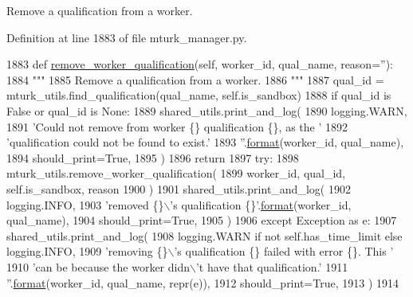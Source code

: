 \begin{DoxyVerb}Remove a qualification from a worker.
\end{DoxyVerb}
 

Definition at line 1883 of file mturk\+\_\+manager.\+py.


\begin{DoxyCode}
1883     \textcolor{keyword}{def }\hyperlink{namespaceparlai_1_1mturk_1_1core_1_1dev_1_1mturk__utils_abc2c057b91641179f7c4bb50dd916488}{remove\_worker\_qualification}(self, worker\_id, qual\_name, reason=''):
1884         \textcolor{stringliteral}{"""}
1885 \textcolor{stringliteral}{        Remove a qualification from a worker.}
1886 \textcolor{stringliteral}{        """}
1887         qual\_id = mturk\_utils.find\_qualification(qual\_name, self.is\_sandbox)
1888         \textcolor{keywordflow}{if} qual\_id \textcolor{keywordflow}{is} \textcolor{keyword}{False} \textcolor{keywordflow}{or} qual\_id \textcolor{keywordflow}{is} \textcolor{keywordtype}{None}:
1889             shared\_utils.print\_and\_log(
1890                 logging.WARN,
1891                 \textcolor{stringliteral}{'Could not remove from worker \{\} qualification \{\}, as the '}
1892                 \textcolor{stringliteral}{'qualification could not be found to exist.'}
1893                 \textcolor{stringliteral}{''}.\hyperlink{namespaceparlai_1_1chat__service_1_1services_1_1messenger_1_1shared__utils_a32e2e2022b824fbaf80c747160b52a76}{format}(worker\_id, qual\_name),
1894                 should\_print=\textcolor{keyword}{True},
1895             )
1896             \textcolor{keywordflow}{return}
1897         \textcolor{keywordflow}{try}:
1898             mturk\_utils.remove\_worker\_qualification(
1899                 worker\_id, qual\_id, self.is\_sandbox, reason
1900             )
1901             shared\_utils.print\_and\_log(
1902                 logging.INFO,
1903                 \textcolor{stringliteral}{'removed \{\}\(\backslash\)'s qualification \{\}'}.\hyperlink{namespaceparlai_1_1chat__service_1_1services_1_1messenger_1_1shared__utils_a32e2e2022b824fbaf80c747160b52a76}{format}(worker\_id, qual\_name),
1904                 should\_print=\textcolor{keyword}{True},
1905             )
1906         \textcolor{keywordflow}{except} Exception \textcolor{keyword}{as} e:
1907             shared\_utils.print\_and\_log(
1908                 logging.WARN \textcolor{keywordflow}{if} \textcolor{keywordflow}{not} self.has\_time\_limit \textcolor{keywordflow}{else} logging.INFO,
1909                 \textcolor{stringliteral}{'removing \{\}\(\backslash\)'s qualification \{\} failed with error \{\}. This '}
1910                 \textcolor{stringliteral}{'can be because the worker didn\(\backslash\)'t have that qualification.'}
1911                 \textcolor{stringliteral}{''}.\hyperlink{namespaceparlai_1_1chat__service_1_1services_1_1messenger_1_1shared__utils_a32e2e2022b824fbaf80c747160b52a76}{format}(worker\_id, qual\_name, repr(e)),
1912                 should\_print=\textcolor{keyword}{True},
1913             )
1914 
\end{DoxyCode}
